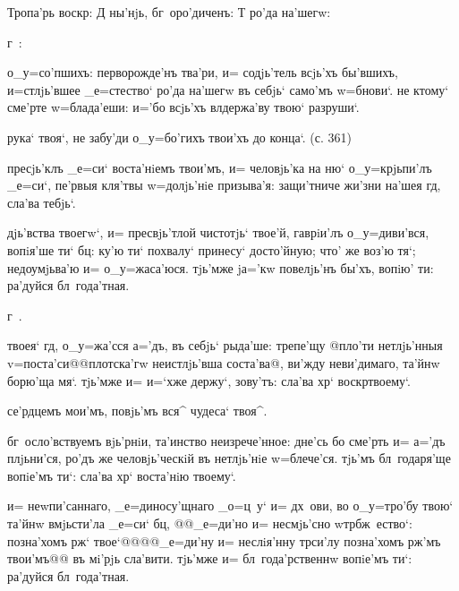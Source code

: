 
Тропа'рь воскр: Д%
ны'нjь, бг~оро'диченъ: Т%
ро'да на'шегw: %

г~:%

о_у=со'пшихъ: перворожде'нъ тва'ри, и= содjь'тель всjь'хъ 
бы'вшихъ, и=стлjь'вшее _е=стество` ро'да на'шегw въ 
себjь` само'мъ w=бнови`. не ктому` сме'рте w=блада'еши: 
и='бо всjь'хъ вл держа'ву твою` разруши`.

рука` твоя`, не забу'ди о_у=бо'гихъ твои'хъ до конца`. 
(с. 361)

пресjь'клъ _е=си` воста'нiемъ твои'мъ, и= человjь'ка на 
ню` о_у=крjьпи'лъ _е=си`, пе'рвыя кля'твы w=долjь'нiе 
призыва'я: защи'тниче жи'зни на'шея гд, сла'ва тебjь`.

дjь'вства твоегw`, и= пресвjь'тлой чистотjь` твое'й, 
гаврiи'лъ о_у=диви'вся, вопiя'ше ти` бц: ку'ю ти` 
похвалу` принесу` досто'йную; что' же воз'ю тя`; 
недоумjьва'ю и= о_у=жаса'юся. тjь'мже jа='кw повелjь'нъ 
бы'хъ, вопiю' ти: ра'дуйся бл~года'тная.

г~.%


твоея` гд, о_у=жа'сся а='дъ, въ себjь` рыда'ше: 
трепе'щу @пло'ти нетлjь'нныя v=поста'си@{@плотска'гw 
неистлjь'вша соста'ва@}, ви'жду неви'димаго, та'йнw 
борю'ща мя`. тjь'мже и= и=`хже держу`, зову'тъ: сла'ва 
хр` воскр твоему`.

се'рдцемъ мои'мъ, повjь'мъ вся^ чудеса` твоя^.

бг~осло'вствуемъ вjь'рнiи, та'инство неизрече'нное: 
дне'сь бо сме'рть и= а='дъ плjьни'ся, ро'дъ же 
человjь'ческiй въ нетлjь'нiе w=блече'ся. тjь'мъ 
бл~годаря'ще вопiе'мъ ти`: сла'ва хр` воста'нiю 
твоему`.

и= неwпи'саннаго, _е=диносу'щнаго _о=ц~у` и= дх~ови, во 
о_у=тро'бу твою` та'йнw вмjьсти'ла _е=си` бц, 
@@_е=ди'но и= несмjь'сно w\т тр бж~ество`: позна'хомъ 
рж` твое`@@{@@_е=ди'ну и= неслiя'нну тр си'лу 
позна'хомъ рж'мъ твои'мъ@@} въ мi'рjь сла'вити. 
тjь'мже и= бл~года'рственнw вопiе'мъ ти`: ра'дуйся 
бл~года'тная.

